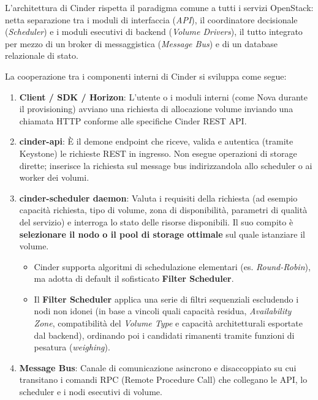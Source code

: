 \documentclass[11pt, a4paper]{article}
\begin{document}
L'architettura di Cinder rispetta il paradigma comune a tutti i servizi OpenStack: netta separazione tra i moduli di interfaccia (\emph{API}), il coordinatore decisionale (\emph{Scheduler}) e i moduli esecutivi di backend (\emph{Volume Drivers}), il tutto integrato per mezzo di un broker di messaggistica (\emph{Message Bus}) e di un database relazionale di stato.


La cooperazione tra i componenti interni di Cinder si sviluppa come segue:
\begin{enumerate}
    \item \textbf{Client / SDK / Horizon}: L'utente o i moduli interni (come Nova durante il provisioning) avviano una richiesta di allocazione volume inviando una chiamata HTTP conforme alle specifiche Cinder REST API.
    \item \textbf{cinder-api}: È il demone endpoint che riceve, valida e autentica (tramite Keystone) le richieste REST in ingresso. Non esegue operazioni di storage dirette; inserisce la richiesta sul message bus indirizzandola allo scheduler o ai worker dei volumi.
    \item \textbf{cinder-scheduler daemon}: Valuta i requisiti della richiesta (ad esempio capacità richiesta, tipo di volume, zona di disponibilità, parametri di qualità del servizio) e interroga lo stato delle risorse disponibili. Il suo compito è \textbf{selezionare il nodo o il pool di storage ottimale} sul quale istanziare il volume.
    \begin{itemize}[noitemsep]
        \item Cinder supporta algoritmi di schedulazione elementari (es. \emph{Round-Robin}), ma adotta di default il sofisticato \textbf{Filter Scheduler}.
        \item Il \textbf{Filter Scheduler} applica una serie di filtri sequenziali escludendo i nodi non idonei (in base a vincoli quali capacità residua, \emph{Availability Zone}, compatibilità del \emph{Volume Type} e capacità architetturali esportate dal backend), ordinando poi i candidati rimanenti tramite funzioni di pesatura (\emph{weighing}).
    \end{itemize}
    \item \textbf{Message Bus}: Canale di comunicazione asincrono e disaccoppiato su cui transitano i comandi RPC (Remote Procedure Call) che collegano le API, lo scheduler e i nodi esecutivi di volume.

\end{enumerate}
\end{document}
